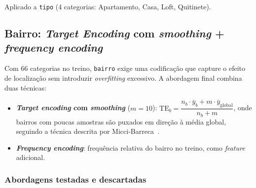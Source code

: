 \documentclass[12pt, a4paper]{article}
\newcommand{\code}[1]{\texttt{#1}}
\begin{document}
Aplicado a \code{tipo} (4 categorias: Apartamento, Casa, Loft, Quitinete).

\subsection{Bairro: \textit{Target Encoding} com \textit{smoothing} + \textit{frequency encoding}}

Com 66 categorias no treino, \code{bairro} exige uma codificação que capture o efeito de localização sem introduzir \textit{overfitting} excessivo. A abordagem final combina duas técnicas:

\begin{itemize}[leftmargin=2em, nosep]
  \item \textbf{\textit{Target encoding} com \textit{smoothing}} ($m=10$): $\text{TE}_b = \dfrac{n_b \cdot \bar{y}_b + m \cdot \bar{y}_{\text{global}}}{n_b + m}$, onde bairros com poucas amostras são puxados em direção à média global, seguindo a técnica descrita por Micci-Barreca~\cite{ref:micci}.
  \item \textbf{\textit{Frequency encoding}}: frequência relativa do bairro no treino, como \textit{feature} adicional.
\end{itemize}

\subsubsection{Abordagens testadas e descartadas}
\end{document}

